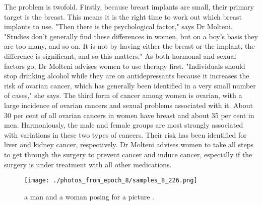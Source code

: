 \documentclass{article}%
\begin{document}
The problem is twofold. Firstly, because breast implants are small, their primary target is the breast. This means it is the right time to work out which breast implants to use. "Then there is the psychological factor," says Dr Molteni. "Studies don't generally find these differences in women, but on a boy's basis they are too many, and so on. It is not by having either the breast or the implant, the difference is significant, and so this matters."\newline%
As both hormonal and sexual factors go, Dr Molteni advises women to use therapy first. "Individuals should stop drinking alcohol while they are on antidepressants because it increases the risk of ovarian cancer, which has generally been identified in a very small number of cases," she says.\newline%
The third form of cancer among women is ovarian, with a large incidence of ovarian cancers and sexual problems associated with it. About 30 per cent of all ovarian cancers in women have breast and about 35 per cent in men.\newline%
Harmoniously, the male and female groups are most strongly associated with variations in these two types of cancers. Their risk has been identified for liver and kidney cancer, respectively.\newline%
Dr Molteni advises women to take all steps to get through the surgery to prevent cancer and induce cancer, especially if the surgery is under treatment with all other medications.\newline%

%


\begin{figure}[h!]%
\centering%
\texttt{[image: ./photos\_from\_epoch\_8/samples\_8\_226.png]}%
\caption{a man and a woman posing for a picture .}%
\end{figure}

%
\end{document}
